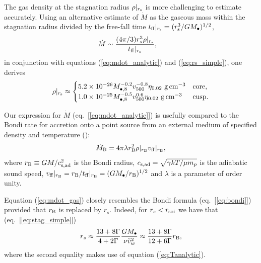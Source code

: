 \documentclass[usenatbib,fleqn]{mn2e}
\newcommand{\rs}{r_s}
\newcommand{\vw}{\tilde{v}_{w}}
\newcommand{\Mbh}[1][]{M_{\bullet#1}}
\newcommand{\Mbheight}{M_{\bullet,8}}
\newcommand{\tff}{t_{\rm ff}}
\newcommand{\densSlope}{\nu}
\begin{document}
The gas density at the stagnation radius $\rho|_{r_{\rm s}}$ is more
challenging to estimate accurately.  Using an alternative estimate of
$\dot{M}$ as the gaseous mass within the stagnation radius divided by
the free-fall time $t_{\rm ff}|_{r_{\rm s}} = (r_{\rm
  s}^{3}/GM_{\bullet})^{1/2}$,
\begin{align}
  &\dot{M}\sim\frac{(4 \pi/3) \rs^3 \rho|_{r_{\rm s}}}{\tff|_{r_{\rm s}}},
  \label{eq:mdot_gas}
\end{align}
 in conjunction with equations (\ref{eq:mdot_analytic}) and (\ref{eq:rs_simple}), one derives
\begin{align}
  \rho|_{r_{\rm s}}\approx
  \begin{cases}
    5.2 \times 10^{-26} \Mbheight^{-0.2} v_{500}^{-0.8}  \eta_{0.02} \,
    \, {\rm g \, cm^{-3}}& \text{core},\\
    1.0 \times 10^{-25}  \Mbheight^{-0.5} v_{500}^{0.6}  \eta_{0.02} \,\, {\rm g \,cm^{-3}} & \text{cusp}.
  \end{cases}
  \label{eq:rhors}
\end{align}


Our expression for $\dot{M}$ (eq.~[\ref{eq:mdot_analytic}]) is usefully compared to the Bondi rate for accretion onto a point source from an external medium of specified density and temperature (\citealt{Bondi52}):
\begin{align}
  \dot{M}_{\rm B} =4\pi \lambda r_{\rm B}^2 \rho|_{r_{\rm B}}v_{\rm ff}|_{r_{\rm B}},
\label{eq:bondi}
\end{align}
where $r_{\rm B} \equiv GM/c_{\rm s,ad}^{2}$ is the Bondi radius,
$c_{\rm s,ad} = \sqrt{\gamma kT/\mu m_p}$ is the adiabatic sound
speed, $v_{\rm ff}|_{r_{\rm B}} = r_{\rm B}/t_{\rm ff}|_{r_{\rm B}} =
(GM_{\bullet}/r_{\rm B})^{1/2}$ and $\lambda$ is a parameter of order
unity.

Equation (\ref{eq:mdot_gas}) closely resembles the Bondi formula (eq.~[\ref{eq:bondi}]) provided that $r_{\rm B}$ is replaced by $\rs$.  Indeed, for $r_{s} < r_{\rm soi}$ we have that (eq.~[\ref{eq:stag_simple}])
\begin{align}
  \rs\approx\frac{13+8\Gamma}{4+2\Gamma}\frac{G \Mbh}{\densSlope
    \vw^2} \approx \frac{13+8\Gamma}{12+6\Gamma}r_{\rm B},
  \label{eq:rbondi}
\end{align}
where the second equality makes use of equation (\ref{eq:Tanalytic}).  
\end{document}

